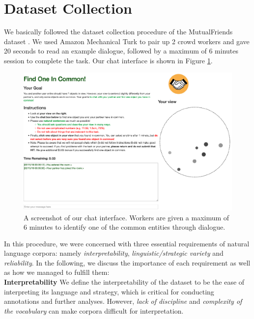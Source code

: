 \section{Dataset Collection}
\label{03_sec:dataset_collection}

We basically followed the dataset collection procedure of the MutualFriends dataset \citep{he2017learning}. We used Amazon Mechanical Turk to pair up 2 crowd workers and gave 20 seconds to read an example dialogue, followed by a maximum of 6 minutes session to complete the task. Our chat interface is shown in Figure \ref{03_fig:annotation}.

\begin{figure}[ht]
\centering
\vspace{1mm}
\includegraphics[width=0.95\columnwidth]{annotation.pdf}
\caption{
A screenshot of our chat interface. Workers are given a maximum of 6 minutes to identify one of the common entities through dialogue.
}
\label{03_fig:annotation}
\end{figure}

In this procedure, we were concerned with three essential requirements of natural language corpora: namely \emph{interpretability}, \emph{linguistic/strategic variety} and \emph{reliability}. In the following, we discuss the importance of each requirement as well as how we managed to fulfill them:
\\

\noindent
\textbf{Interpretability}\quad
We define the interpretability of the dataset to be the ease of interpreting its language and strategy, which is critical for conducting annotations and further analyses. However, \emph{lack of discipline} and \emph{complexity of the vocabulary} can make corpora difficult for interpretation.

